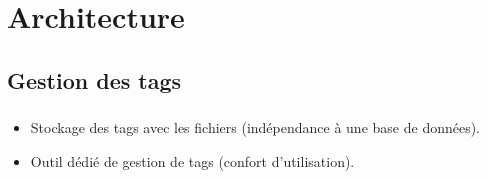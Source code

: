 \documentclass[10pt]{beamer}
\begin{document}
\section{Architecture}
\subsection{Gestion des tags}
\begin{frame}
    \frametitle{\subsecname}
    \begin{itemize}
        \pause
        \item Stockage des tags avec les fichiers (indépendance à une base de données).
        \pause
        \item Outil dédié de gestion de tags (confort d'utilisation).
    \end{itemize}
\end{frame}
\end{document}
